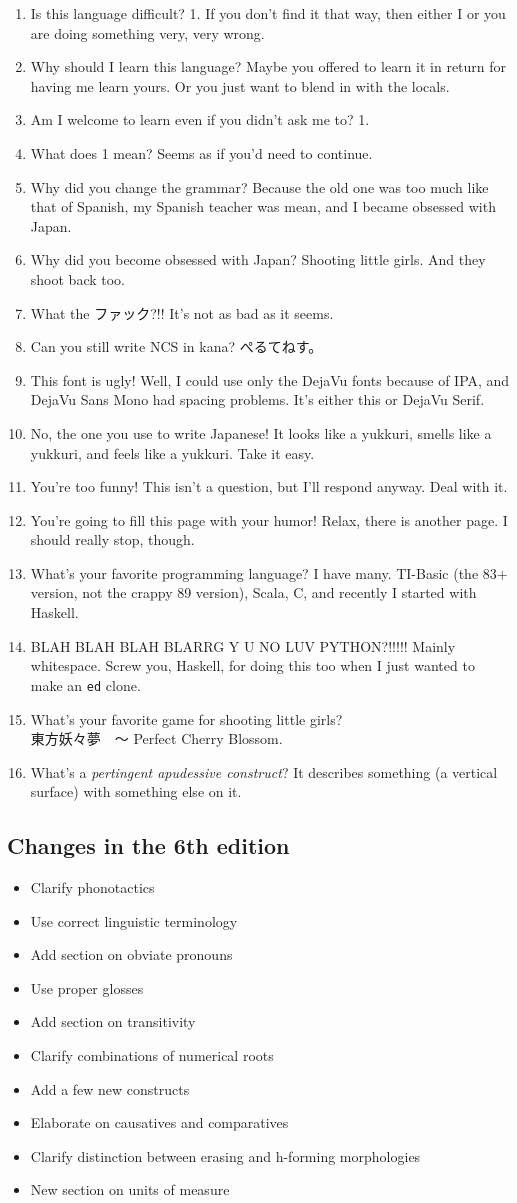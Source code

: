 \documentclass{book}
\begin{document}
\newcommand{\qa}[2]{\item #1 #2}

\begin{enumerate}
  \qa{Is this language difficult?}{1. If you don't find it that way, then either I or you are doing something very, very wrong.}
  \qa{Why should I learn this language?}{Maybe you offered to learn it in return for having me learn yours. Or you just want to blend in with the locals.}
  \qa{Am I welcome to learn even if you didn't ask me to?}{1.}
  \qa{What does 1 mean?}{Seems as if you'd need to continue.}
  \qa{Why did you change the grammar?}{Because the old one was too much like that of Spanish, my Spanish teacher was mean, and I became obsessed with Japan.}
  \qa{Why did you become obsessed with Japan?}{Shooting little girls. And they shoot back too.}
  \qa{What the \textsf{ファック}?!!}{It's not as bad as it seems.}
  \qa{Can you still write NCS in kana?}{\textsf{ぺるてねす。}}
  \qa{This font is ugly!}{Well, I could use only the DejaVu fonts because of IPA, and DejaVu Sans Mono had spacing problems. It's either this or DejaVu Serif.}
  \qa{No, the one you use to write Japanese!}{It looks like a yukkuri, smells like a yukkuri, and feels like a yukkuri. Take it easy.}
  \qa{You're too funny!}{This isn't a question, but I'll respond anyway. Deal with it.}
  \qa{You're going to fill this page with your humor!}{Relax, there is another page. I should really stop, though.}
  \qa{What's your favorite programming language?}{I have many. TI-Basic (the 83+ version, not the crappy 89 version), Scala, C, and recently I started with Haskell.}
  \qa{BLAH BLAH BLAH BLARRG Y U NO LUV PYTHON?!!!!!}{Mainly whitespace. Screw you, Haskell, for doing this too when I just wanted to make an \texttt{ed} clone.}
  \qa{What's your favorite game for shooting little girls?}{\\\textsf{東方妖々夢　～} Perfect Cherry Blossom.}
  \qa{What's a \emph{pertingent apudessive construct}?}{It describes something (a vertical surface) with something else on it.}
\end{enumerate}

\subsection{Changes in the 6th edition}

\begin{itemize}
	\item Clarify phonotactics
	\item Use correct linguistic terminology
	\item Add section on obviate pronouns
	\item Use proper glosses
	\item Add section on transitivity
	\item Clarify combinations of numerical roots
	\item Add a few new constructs
	\item Elaborate on causatives and comparatives
	\item Clarify distinction between erasing and h-forming morphologies
	\item New section on units of measure
\end{itemize}
\end{document}
